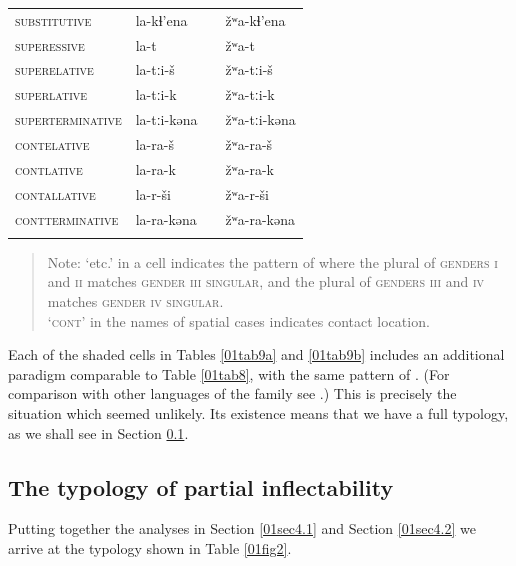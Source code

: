 \documentclass[output=paper,colorlinks,citecolor=brown]{langscibook}
\begin{document}
\begin{table}[p]
\begin{tabularx}{0.85\textwidth}{llll}
		\textsc{substitutive} & la-kɬ’ena & & žʷa-kɬ’ena \\
		\textsc{superessive} & la-t & & žʷa-t \\
		\textsc{superelative} & la-tːi-š & & žʷa-tːi-š \\
		\textsc{superlative} & la-tːi-k & & žʷa-tːi-k \\
		\textsc{superterminative} & la-tːi-kǝna & & žʷa-tːi-kǝna \\
		\textsc{contelative} & la-ra-š & & žʷa-ra-š \\
		\textsc{contlative} & la-ra-k & & žʷa-ra-k \\
		\textsc{contallative} & la-r-ši & & žʷa-r-ši \\
		\textsc{contterminative} & la-ra-kǝna & & žʷa-ra-kǝna \\
		\lspbottomrule
	\end{tabularx}

	\begin{quote}
		Note: ‘etc.’ in a cell indicates the pattern of  where the plural of \textsc{genders i} and \textsc{ii} matches \textsc{gender iii singular}, and the plural of \textsc{genders iii} and \textsc{iv} matches \textsc{gender iv singular}. \\
		\textsc{‘cont’} in the names of spatial cases indicates contact location.
	\end{quote}
\end{table}

\addtocounter{table}{-1}
\renewcommand{\thetable}{\arabic{table}}

\largerpage
Each of the shaded cells in Tables \ref{01tab9a} and \ref{01tab9b} includes an additional paradigm comparable to Table \ref{01tab8}, with the same pattern of . (For comparison with other languages of the family see \citealt[220--223]{kibrikkodzasov1990}.) This is precisely the situation which seemed unlikely. Its existence means that we have a full typology, as we shall see in Section \ref{01sec4.3}.

\subsection{The typology of partial inflectability} \label{01sec4.3}

Putting together the analyses in Section \ref{01sec4.1} and Section \ref{01sec4.2} we arrive at the \mbox{typology} shown in Table \ref{01fig2}.
\end{document}
